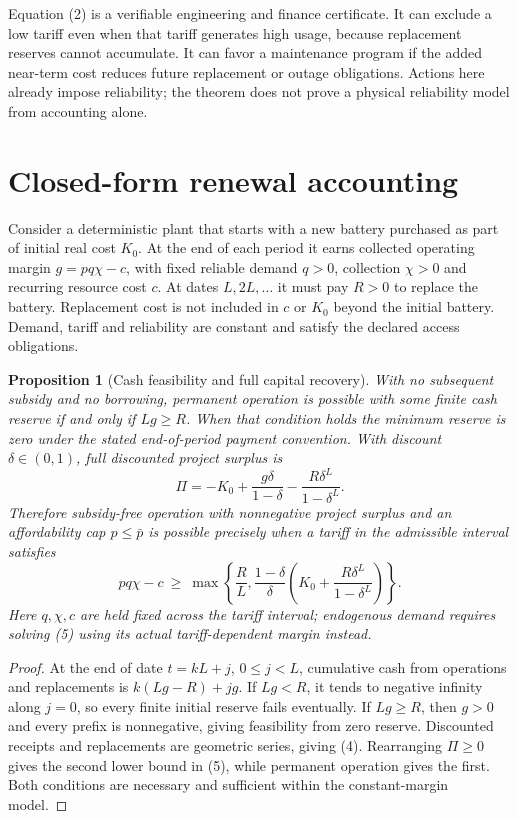\documentclass[11pt]{article}
\newtheorem{proposition}[theorem]{Proposition}
\begin{document}
Equation (2) is a verifiable engineering and finance certificate. It can
exclude a low tariff even when that tariff generates high usage, because
replacement reserves cannot accumulate. It can favor a maintenance
program if the added near-term cost reduces future replacement or outage
obligations. Actions here already impose reliability; the theorem does not
prove a physical reliability model from accounting alone.

\section{Closed-form renewal accounting}
Consider a deterministic plant that starts with a new battery purchased
as part of initial real cost $K_0$. At the end of each period it earns
collected operating margin $g=pq\chi-c$, with fixed reliable demand $q>0$,
collection $\chi>0$ and recurring resource cost $c$. At dates
$L,2L,\ldots$ it must pay $R>0$ to replace the battery. Replacement cost
is not included in $c$ or $K_0$ beyond the initial battery. Demand, tariff
and reliability are constant and satisfy the declared access obligations.

\begin{proposition}[Cash feasibility and full capital recovery]
With no subsequent subsidy and no borrowing, permanent operation is
possible with some finite cash reserve if and only if $Lg\geq R$.
When that condition holds the minimum reserve is zero under the stated
end-of-period payment convention. With discount $\delta\in(0,1)$,
full discounted project surplus is
\[
 \Pi=-K_0+\frac{g\delta}{1-\delta}
                 -\frac{R\delta^L}{1-\delta^L}.             \tag{4}
\]
Therefore subsidy-free operation with nonnegative project surplus and
an affordability cap $p\leq\bar p$ is possible precisely when a tariff
in the admissible interval satisfies
\[
 pq\chi-c\ \geq\
 \max\left\{\frac RL,
 \frac{1-\delta}{\delta}
       \left(K_0+\frac{R\delta^L}{1-\delta^L}\right)\right\}.\tag{5}
\]
Here $q,\chi,c$ are held fixed across the tariff interval; endogenous demand
requires solving (5) using its actual tariff-dependent margin instead.
\end{proposition}
\begin{proof}
At the end of date $t=kL+j$, $0\leq j<L$, cumulative cash from operations
and replacements is $k(Lg-R)+jg$. If $Lg<R$, it tends to negative infinity
along $j=0$, so every finite initial reserve fails eventually. If
$Lg\geq R$, then $g>0$ and every prefix is nonnegative, giving feasibility
from zero reserve. Discounted receipts and replacements are geometric
series, giving (4). Rearranging $\Pi\geq0$ gives the second lower bound
in (5), while permanent operation gives the first. Both conditions are
necessary and sufficient within the constant-margin model.
\end{proof}
\end{document}
